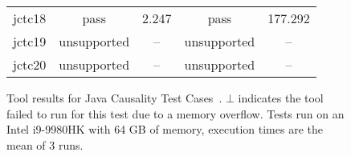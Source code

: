 \begin{figure}[t]
\begin{center}
\begin{tabularx}{0.9\textwidth}{c||c|c|c|c}
    jctc18                         & pass   & 2.247               & pass   & 177.292 \\
    jctc19                         & unsupported   & --           & unsupported   & -- \\
    jctc20                         & unsupported   & --           & unsupported   & -- \\
  \end{tabularx}
  \caption{\label{fig:tool} Tool results for Java Causality Test Cases~\cite{PughWebsite}. $\bot$ indicates the tool failed to run for this test due to a memory overflow. Tests run on an Intel i9-9980HK with 64 GB of memory, execution times are the mean of 3 runs.}
\end{center}
\end{figure}
